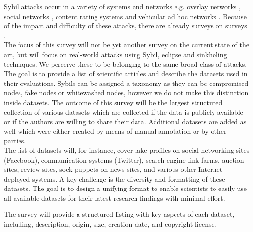 	Sybil attacks occur in a variety of systems and networks e.g. overlay networks \cite{singh2004defending}, social networks \cite{cao2014understanding, chiluka2012leveraging, mohaisen2011keep}, content rating systems \cite{kakhki11mitigating, tran2009sybil} and vehicular ad hoc networks \cite{park2009defense}.
	Because of the impact and difficulty of these attacks, there are already surveys on surveys \cite{koll2014state, mohaisen2013sybil, viswanath2011analysis}.\\
	The focus of this survey will not be yet another survey on the current state of the art, but will focus on real-world attacks using Sybil, eclipse and sinkholing techniques. 
	We perceive these to be belonging to the same broad class of attacks. 
	The goal is to provide a list of scientific articles and describe the datasets used in their evaluations.
	Sybils can be assigned a taxonomy as they can be compromised nodes, fake nodes \cite{newsome2004sybil} or whitewashed nodes, however we do not make this distinction inside datasets.  
	The outcome of this survey will be the largest structured collection of various datasets which are collected if the data is publicly available or if the authors are willing to share their data. Additional datasets are added as well which were either created by means of manual annotation or by other parties.\\
	The list of datasets will, for instance, cover fake profiles on social networking sites (Facebook), communication systems (Twitter), search engine link farms, auction sites, review sites, sock puppets on news sites, and various other Internet-deployed systems. 
	A key challenge is the diversity and formatting of these datasets. 
	The goal is to design a unifying format to enable scientists to easily use all available datasets for their latest research findings with minimal effort.
	
	The survey will provide a structured listing with key aspects of each dataset, including, description, origin, size, creation date, and copyright license.